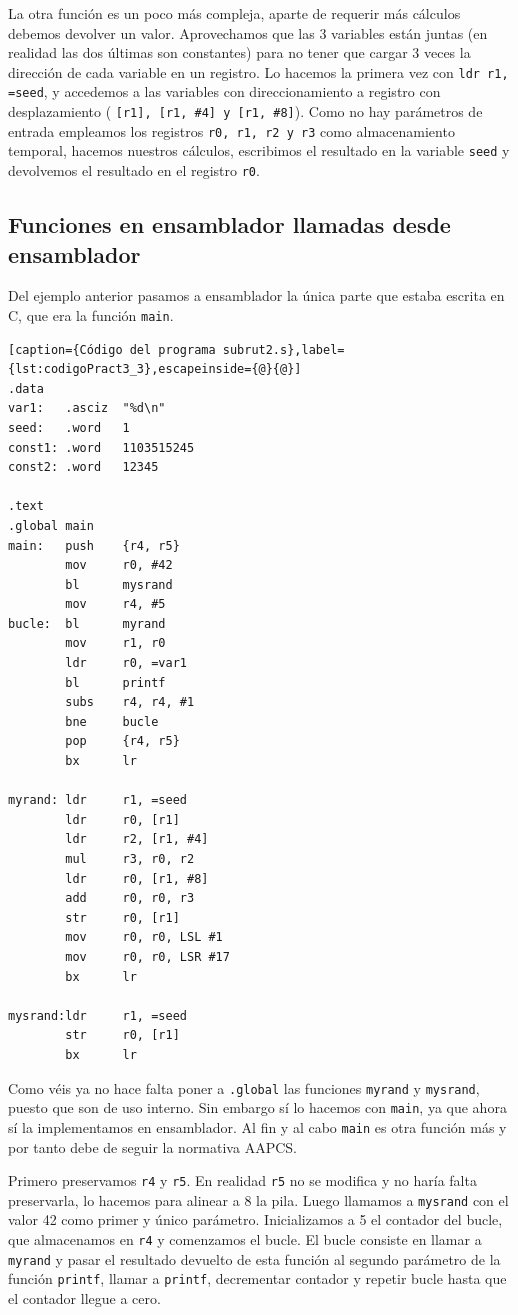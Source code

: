 La otra función es un poco más compleja, aparte de requerir más cálculos debemos
devolver un valor. Aprovechamos que las 3 variables están juntas (en realidad las
dos últimas son constantes) para no tener que cargar 3 veces la dirección de cada
variable en un registro. Lo hacemos la primera vez con {\tt ldr r1, =seed}, y
accedemos a las variables con direccionamiento a registro con desplazamiento (
{\tt [r1], [r1, \#4] y [r1, \#8]}). Como no hay parámetros de entrada empleamos
los registros {\tt r0, r1, r2 y r3} como almacenamiento temporal, hacemos nuestros
cálculos, escribimos el resultado en la variable {\tt seed} y devolvemos el
resultado en el registro {\tt r0}.

\subsection{Funciones en ensamblador llamadas desde ensamblador}

Del ejemplo anterior pasamos a ensamblador la única parte que estaba escrita en
C, que era la función {\tt main}.

\begin{lstlisting}[caption={Código del programa subrut2.s},label={lst:codigoPract3_3},escapeinside={@}{@}]
.data
var1:   .asciz  "%d\n"
seed:   .word   1
const1: .word   1103515245
const2: .word   12345

.text
.global main
main:   push    {r4, r5}
        mov     r0, #42
        bl      mysrand
        mov     r4, #5
bucle:  bl      myrand
        mov     r1, r0
        ldr     r0, =var1
        bl      printf
        subs    r4, r4, #1
        bne     bucle
        pop     {r4, r5}
        bx      lr

myrand: ldr     r1, =seed
        ldr     r0, [r1]
        ldr     r2, [r1, #4]
        mul     r3, r0, r2
        ldr     r0, [r1, #8]
        add     r0, r0, r3
        str     r0, [r1]
        mov     r0, r0, LSL #1
        mov     r0, r0, LSR #17
        bx      lr

mysrand:ldr     r1, =seed
        str     r0, [r1]
        bx      lr
\end{lstlisting}

Como véis ya no hace falta poner a {\tt .global} las funciones {\tt myrand} y {\tt mysrand},
puesto que son de uso interno. Sin embargo sí lo hacemos con {\tt main}, ya que ahora sí
la implementamos en ensamblador. Al fin y al cabo {\tt main} es otra función más y por
tanto debe de seguir la normativa AAPCS.

Primero preservamos {\tt r4} y {\tt r5}. En realidad {\tt r5} no se modifica y no haría falta
preservarla, lo hacemos para alinear a 8 la pila. Luego llamamos a {\tt mysrand} con el valor 42
como primer y único parámetro. Inicializamos a 5 el contador del bucle, que almacenamos en
{\tt r4} y comenzamos el bucle. El bucle consiste en llamar a {\tt myrand} y pasar el resultado
devuelto de esta función al segundo parámetro de la función {\tt printf}, llamar a {\tt printf},
decrementar contador y repetir bucle hasta que el contador llegue a cero.

